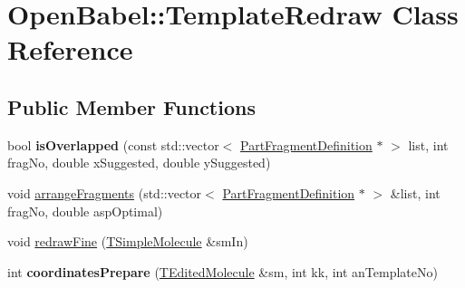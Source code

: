 \hypertarget{class_open_babel_1_1_template_redraw}{\section{Open\-Babel\-:\-:Template\-Redraw Class Reference}
\label{class_open_babel_1_1_template_redraw}
}
\subsection*{Public Member Functions}
\begin{DoxyCompactItemize}
\item 
\hypertarget{class_open_babel_1_1_template_redraw_abb4128085b19121f5ba1272cfa200963}{bool {\bfseries is\-Overlapped} (const std\-::vector$<$ \hyperlink{class_open_babel_1_1_part_fragment_definition}{Part\-Fragment\-Definition} $\ast$ $>$ list, int frag\-No, double x\-Suggested, double y\-Suggested)}\label{class_open_babel_1_1_template_redraw_abb4128085b19121f5ba1272cfa200963}

\item 
void \hyperlink{class_open_babel_1_1_template_redraw_ab513c6abb06586d54318936bf965f39d}{arrange\-Fragments} (std\-::vector$<$ \hyperlink{class_open_babel_1_1_part_fragment_definition}{Part\-Fragment\-Definition} $\ast$ $>$ \&list, int frag\-No, double asp\-Optimal)
\item 
void \hyperlink{class_open_babel_1_1_template_redraw_a25c46c399604d008f957124917ef36af}{redraw\-Fine} (\hyperlink{class_open_babel_1_1_t_simple_molecule}{T\-Simple\-Molecule} \&sm\-In)
\item 
\hypertarget{class_open_babel_1_1_template_redraw_abc66a0d6055fe100e3529d41774fef6e}{int {\bfseries coordinates\-Prepare} (\hyperlink{class_open_babel_1_1_t_edited_molecule}{T\-Edited\-Molecule} \&sm, int kk, int an\-Template\-No)}\label{class_open_babel_1_1_template_redraw_abc66a0d6055fe100e3529d41774fef6e}

\end{DoxyCompactItemize}


